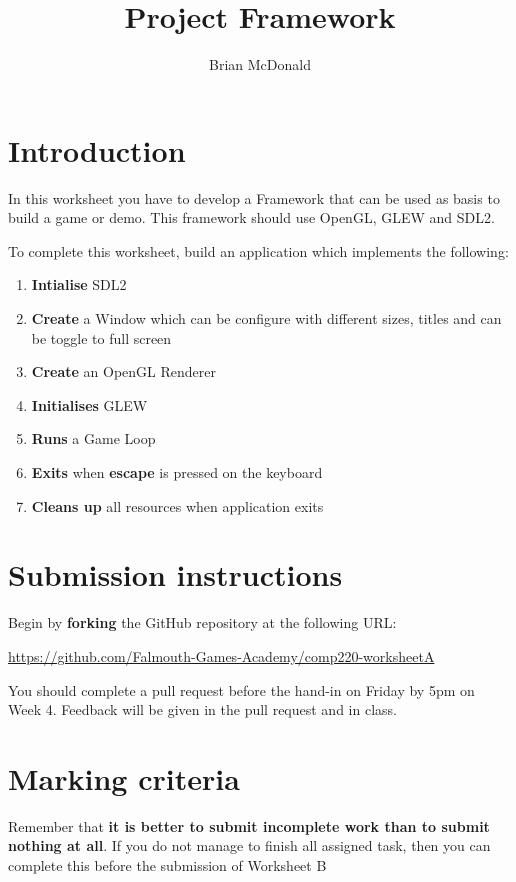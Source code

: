 \documentclass{../../../fal_assignment}
\title{Project Framework}
\author{Brian McDonald}
\begin{document}
\maketitle

\section*{Introduction}

In this worksheet you have to develop a Framework that can be used as basis to build a game or demo. This framework should use OpenGL, GLEW and SDL2.

To complete this worksheet, build an application which implements the following:
\begin{enumerate}[label=(\alph*)]
	\item \textbf{Intialise} SDL2
	\item \textbf{Create} a Window which can be configure with different sizes, titles and can be toggle to full screen
	\item \textbf{Create} an OpenGL Renderer
	\item \textbf{Initialises} GLEW
	\item \textbf{Runs} a Game Loop
	\item \textbf{Exits} when \textbf{escape} is pressed on the keyboard 
	\item \textbf{Cleans up} all resources when application exits
\end{enumerate}

\section*{Submission instructions}

Begin by \textbf{forking} the GitHub repository at the following URL:

\url{https://github.com/Falmouth-Games-Academy/comp220-worksheetA}

You should complete a pull request before the hand-in on Friday by 5pm on Week 4. Feedback will be given in the pull request and in class.

\section*{Marking criteria}

Remember that \textbf{it is better to submit incomplete work than to submit nothing at all}. If you do not manage to finish all assigned task, then you can complete this before the submission of Worksheet B
\end{document}
